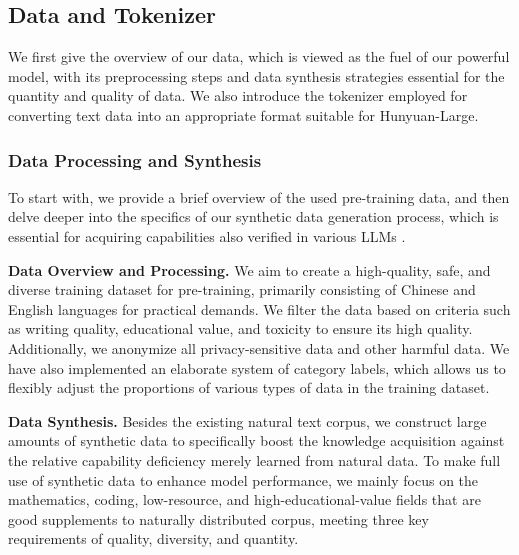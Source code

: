 \documentclass{article}
\begin{document}
\subsection{Data and Tokenizer}

We first give the overview of our data, which is viewed as the fuel of our powerful model, with its preprocessing steps and data synthesis strategies essential for the quantity and quality of data. We also introduce the tokenizer employed for converting text data into an appropriate format suitable for Hunyuan-Large.

\subsubsection{Data Processing and Synthesis}
\label{sec:data}

To start with, we provide a brief overview of the used pre-training data, and then delve deeper into the specifics of our synthetic data generation process, which is essential for acquiring capabilities also verified in various LLMs \citep{dubey2024llama,abdin2024phi3,liu2024best}.

\textbf{Data Overview and Processing.}
We aim to create a high-quality, safe, and diverse training dataset for pre-training, primarily consisting of Chinese and English languages for practical demands. We filter the data based on criteria such as writing quality, educational value, and toxicity to ensure its high quality. Additionally, we anonymize all privacy-sensitive data and other harmful data. We have also implemented an elaborate system of category labels, which allows us to flexibly adjust the proportions of various types of data in the training dataset. 

\textbf{Data Synthesis.}
Besides the existing natural text corpus, we construct large amounts of synthetic data to specifically boost the knowledge acquisition against the relative capability deficiency merely learned from natural data. To make full use of synthetic data to enhance model performance, we mainly focus on the mathematics, coding, low-resource, and high-educational-value fields that are good supplements to naturally distributed corpus, meeting three key requirements of quality, diversity, and quantity.
\end{document}
